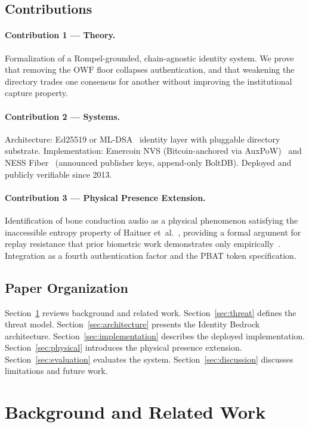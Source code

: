 \documentclass[11pt,a4paper]{article}
\theoremstyle{definition}
\newcommand{\OWF}{\mathrm{OWF}}
\newcommand{\PBAT}{\textsf{PBAT}}
\newcommand{\BD}{\textsf{Identity Bedrock}}
\begin{document}
\subsection{Contributions}

\paragraph{Contribution 1 --- Theory.}
Formalization of a Rompel-grounded, chain-agnostic identity system.
We prove that removing the $\OWF$ floor collapses authentication, and
that weakening the directory trades one consensus for another without
improving the institutional capture property.

\paragraph{Contribution 2 --- Systems.}
Architecture: Ed25519 or ML-DSA~\cite{FIPS204} identity layer with
pluggable directory substrate. Implementation: Emercoin NVS
(Bitcoin-anchored via AuxPoW)~\cite{Emercoin} and NESS
Fiber~\cite{DPO} (announced publisher keys, append-only BoltDB).
Deployed and publicly verifiable since 2013.

\paragraph{Contribution 3 --- Physical Presence Extension.}
Identification of bone conduction audio as a physical phenomenon
satisfying the inaccessible entropy property of Haitner
et~al.~\cite{Haitner10}, providing a formal argument for replay
resistance that prior biometric work demonstrates only
empirically~\cite{HeadSonic25,HCRAuth24}. Integration as a fourth
authentication factor and the \PBAT{} token specification.

\subsection{Paper Organization}

Section~\ref{sec:background} reviews background and related work.
Section~\ref{sec:threat} defines the threat model.
Section~\ref{sec:architecture} presents the \BD{} architecture.
Section~\ref{sec:implementation} describes the deployed implementation.
Section~\ref{sec:physical} introduces the physical presence extension.
Section~\ref{sec:evaluation} evaluates the system.
Section~\ref{sec:discussion} discusses limitations and future work.

\section{Background and Related Work}
\label{sec:background}
\end{document}
